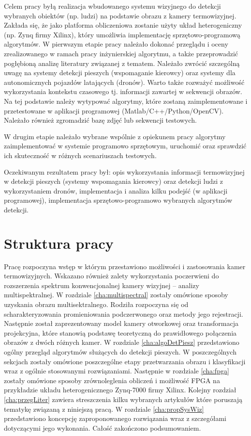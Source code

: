 Celem pracy byłą realizacja wbudowanego systemu wizyjnego do detekcji wybranych obiektów (np. ludzi) na podstawie obrazu z kamery termowizyjnej. Zakłada się, że jako platforma obliczeniowa zostanie użyty układ heterogeniczny (np. Zynq firmy Xilinx), który umożliwia implementację sprzętowo-programową algorytmów.
W pierwszym etapie pracy należało dokonać przeglądu i oceny zrealizowanego w ramach pracy inżynierskiej algorytmu, a także przeprowadzić pogłębioną analizę literatury związanej z tematem. Należało zwrócić szczególną uwagę na systemy detekcji pieszych (wspomaganie kierowcy) oraz systemy dla autonomicznych pojazdów latających (dronów). Warto także rozważyć możliwość wykorzystania kontekstu czasowego tj. informacji zawartej w sekwencji obrazów. Na tej podstawie należy wytypować algorytmy, które zostaną zaimplementowane i przetestowane w aplikacji programowej (Matlab/C++/Python/OpenCV). Należało również zgromadzić bazę zdjęć lub sekwencji testowych.

W drugim etapie należało wybrane wspólnie z opiekunem pracy algorytmy zaimplementować w systemie programowo sprzętowym, uruchomić oraz sprawdzić ich skuteczność w różnych scenariuszach testowych.

Oczekiwanym rezultatem pracy był: opis wykorzystania informacji termowizyjnej w detekcji pieszych (systemy wspomagania kierowcy) oraz detekcji ludzi z wykorzystaniem dronów, implementacja i analiza kilku podejść (w aplikacji programowej), implementacja sprzętowo-programowo wybranych algorytmów detekcji.

\section{Struktura pracy}

Pracę rozpoczyna wstęp w którym przestawiono możliwości i zastosowania kamer termowizyjnych. Wskazano również zalety wykorzystania poczerwieni do rozszerzenia spektrum konwencjonalnej kamery wizyjnej – analizy multispektralnej. 
W rozdziale \ref{cha:multispectral} zostały omówione sposoby uzyskania obrazu multisektralnego. Rodziła rozpoczyna się od scharakteryzowania promieniowania podczerwonego oraz metody jego rejestracji. Następnie został zaprezentowany model kamery otworkowej oraz transformacja projekcyjna, które stanowią podstawę teoretyczną do prawidłowego połączenia obrazów z dwóch różnych kamer. 
W rozdziale \ref{cha:algoDetPiesz} przedstawiono ogólny przegląd algorytmów służących do detekcji pieszych. W poszczególnych sekcjach zostały omówione poszczególne etapy przetwarzania obrazu i klasyfikacji wraz z ogólnie stosowanymi rozwiązaniami.
Następnie w rozdziale \ref{cha:fpga} zostały omówione sposoby zrównoleglenia obliczeń i możliwość FPGA na przykładzie układu heterogenicznego Zynq-7000 firmy Xilinx.
Kolejny rozdział \ref{cha:przegLiter} zawiera streszczenia kilku wybranych artykułów które poruszają tematykę związaną z niniejszą pracą. 
W rozdziale \ref{cha:propSysWiz} przedstawiono koncepcję zaproponowanego rozwiązania wraz z szczegółami dotyczącymi jego wykonania.
Całość zakończono podsumowaniem.


